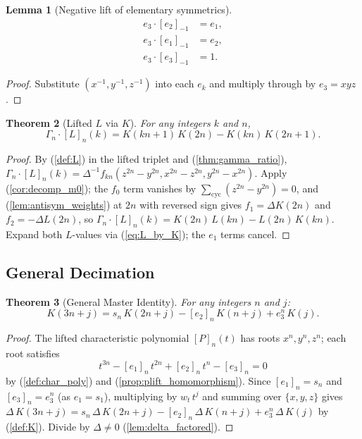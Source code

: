 \documentclass[12pt]{article}
\newtheorem{theorem}{Theorem}[section]
\newtheorem{lemma}[theorem]{Lemma}
\theoremstyle{definition}
\newcommand{\cycsum}[1]{\sum_{\mathrm{cyc}}#1}
\newcommand{\lift}[2]{[#1]_{#2}}
\newcommand{\Gdelta}[1]{\Gamma_{#1}}
\begin{document}
	\begin{lemma}[Negative lift of elementary symmetrics]
		\label{lem:neg_lift_esym}
		\begin{align*}
			e_3 \cdot \lift{e_2}{-1} &= e_1, \\
			e_3 \cdot \lift{e_1}{-1} &= e_2, \\
			e_3 \cdot \lift{e_3}{-1} &= 1.
		\end{align*}
	\end{lemma}
	\begin{proof}
		Substitute $(x^{-1}, y^{-1}, z^{-1})$ into each $e_k$ and multiply through by $e_3 = xyz$.
	\end{proof}
	
	\begin{theorem}[Lifted $L$ via $K$]
		\label{thm:lifted_L_pure}
		For any integers $k$ and $n$,
		\[ \Gdelta{n} \cdot \lift{L}{n}(k) = K(kn+1)\,K(2n) - K(kn)\,K(2n+1). \]
	\end{theorem}
	\begin{proof}
		By (\ref{def:L}) in the lifted triplet and (\ref{thm:gamma_ratio}), $\Gdelta{n}\cdot\lift{L}{n}(k) = \Delta^{-1} f_{kn}(z^{2n}-y^{2n}, x^{2n}-z^{2n}, y^{2n}-x^{2n})$. Apply (\ref{cor:decomp_m0}); the $f_0$ term vanishes by $\cycsum{(z^{2n}-y^{2n})}=0$, and (\ref{lem:antisym_weights}) at $2n$ with reversed sign gives $f_1 = \Delta K(2n)$ and $f_2 = -\Delta L(2n)$, so $\Gdelta{n}\cdot\lift{L}{n}(k) = K(2n)\,L(kn) - L(2n)\,K(kn)$. Expand both $L$-values via (\ref{eq:L_by_K}); the $e_1$ terms cancel.
	\end{proof}
	
	\subsection{General Decimation}
	
	\begin{theorem}[General Master Identity]
		\label{thm:general_master}
		For any integers $n$ and $j$:
		\[ K(3n+j) = s_n\,K(2n+j) - \lift{e_2}{n}\,K(n+j) + e_3^n\,K(j). \]
	\end{theorem}
	\begin{proof}
		The lifted characteristic polynomial $\lift{P}{n}(t)$ has roots $x^n, y^n, z^n$; each root satisfies
		\[ t^{3n} - \lift{e_1}{n}\,t^{2n} + \lift{e_2}{n}\,t^{n} - \lift{e_3}{n} = 0 \]
		by (\ref{def:char_poly}) and (\ref{prop:plift_homomorphism}). Since $\lift{e_1}{n} = s_n$ and $\lift{e_3}{n} = e_3^n$ (as $e_1 = s_1$), multiplying by $w_t\,t^j$ and summing over $\{x,y,z\}$ gives $\Delta\,K(3n+j) = s_n\,\Delta\,K(2n+j) - \lift{e_2}{n}\,\Delta\,K(n+j) + e_3^n\,\Delta\,K(j)$ by (\ref{def:K}). Divide by $\Delta \neq 0$ (\ref{lem:delta_factored}).
	\end{proof}
	
\end{document}
